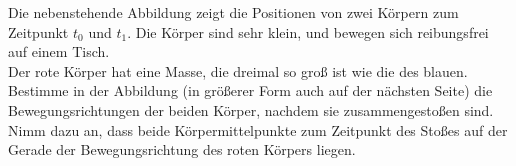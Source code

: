 \begin{minipage}[b]{0.6\textwidth}
\begin{Exercise}[label = col1, title = Stoßaufnahme, origin = Aaron Wild, difficulty = 5]
Die nebenstehende Abbildung zeigt die Positionen von zwei Körpern zum Zeitpunkt $t_0$ und $t_1$. Die Körper sind sehr klein, und bewegen sich reibungsfrei auf einem Tisch.\\
Der rote Körper hat eine Masse, die dreimal so groß ist wie die des blauen.\\
Bestimme in der Abbildung (in größerer Form auch auf der nächsten Seite) die Bewegungsrichtungen der beiden Körper, nachdem sie zusammengestoßen sind. Nimm dazu an, dass beide Körpermittelpunkte zum Zeitpunkt des Stoßes auf der Gerade der Bewegungsrichtung des roten Körpers liegen.
\end{Exercise}
\end{minipage}
\begin{minipage}[b]{0.4\textwidth}
	\flushright
	
\end{minipage}
